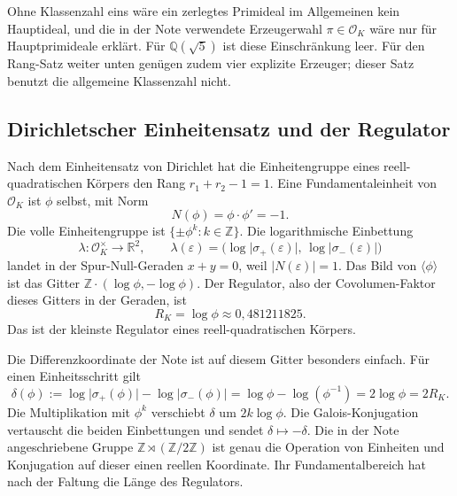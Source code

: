 \documentclass[11pt,a4paper]{article}
\theoremstyle{plain}
\theoremstyle{definition}
\newcommand{\Z}{\mathbb{Z}}
\newcommand{\Q}{\mathbb{Q}}
\newcommand{\R}{\mathbb{R}}
\newcommand{\OK}{\mathcal{O}_K}
\numberwithin{equation}{section}
\begin{document}
Ohne Klassenzahl eins wäre ein zerlegtes Primideal im Allgemeinen kein
Hauptideal, und die in der Note verwendete Erzeugerwahl $\pi\in\OK$ wäre nur
für Hauptprimideale erklärt.
Für $\Q(\sqrt{5})$ ist diese Einschränkung leer.
Für den Rang-Satz weiter unten genügen zudem vier explizite Erzeuger;
dieser Satz benutzt die allgemeine Klassenzahl nicht.

\subsection{Dirichletscher Einheitensatz und der Regulator}

Nach dem Einheitensatz von Dirichlet hat die Einheitengruppe eines
reell-quadratischen Körpers den Rang $r_1+r_2-1=1$.
Eine Fundamentaleinheit von $\OK$ ist $\phi$ selbst, mit Norm
\begin{equation}
N(\phi)=\phi\cdot\phi'=-1.
\end{equation}
Die volle Einheitengruppe ist $\{\pm\phi^k:k\in\Z\}$.
Die logarithmische Einbettung
\begin{equation}
\lambda:\OK^\times\to\R^2,
\qquad
\lambda(\varepsilon)=\bigl(\log\lvert\sigma_+(\varepsilon)\rvert,\,
\log\lvert\sigma_-(\varepsilon)\rvert\bigr)
\end{equation}
landet in der Spur-Null-Geraden $x+y=0$, weil $\lvert N(\varepsilon)\rvert=1$.
Das Bild von $\langle\phi\rangle$ ist das Gitter $\Z\cdot(\log\phi,-\log\phi)$.
Der Regulator, also der Covolumen-Faktor dieses Gitters in der Geraden, ist
\begin{equation}
R_K=\log\phi\approx 0{,}481211825.
\end{equation}
Das ist der kleinste Regulator eines reell-quadratischen Körpers.

Die Differenzkoordinate der Note ist auf diesem Gitter besonders einfach.
Für einen Einheitsschritt gilt
\begin{equation}
\delta(\phi)
:=\log\lvert\sigma_+(\phi)\rvert-\log\lvert\sigma_-(\phi)\rvert
=\log\phi-\log(\phi^{-1})
=2\log\phi=2R_K.
\end{equation}
Die Multiplikation mit $\phi^k$ verschiebt $\delta$ um $2k\log\phi$.
Die Galois-Konjugation vertauscht die beiden Einbettungen und sendet
$\delta\mapsto-\delta$.
Die in der Note angeschriebene Gruppe $\Z\rtimes(\Z/2\Z)$ ist genau die
Operation von Einheiten und Konjugation auf dieser einen reellen Koordinate.
Ihr Fundamentalbereich hat nach der Faltung die Länge des Regulators.

\end{document}
